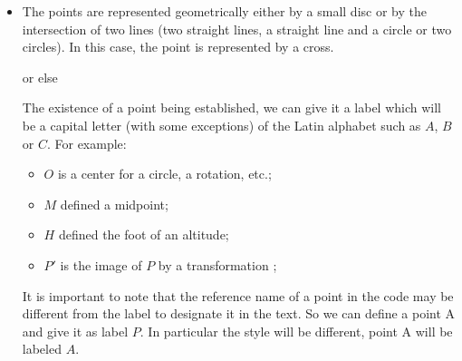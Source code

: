 \begin{itemize}
\item The points are represented geometrically either by a small disc or by the intersection of two lines (two straight lines, a straight line and a circle or two circles). In this case, the point is represented by a cross. 

\begin{tkzexample}[latex=6cm, small]     
\end{tkzexample}

or else

\begin{tkzexample}[latex=6cm, small]     
    \end{tkzexample}  

The existence of a point being established, we can give it a label which will be a capital letter (with some exceptions) of the Latin alphabet such as $A$, $B$ or $C$. For example:
\begin{itemize}
\item $O$ is a center for a circle, a rotation, etc.;
\item $M$ defined a midpoint;
\item $H$ defined the foot of an altitude;
\item $P'$ is the image of $P$ by a transformation ;
\end{itemize}

It is important to note that the reference name of a point in the code may be different from the label to designate it in the text. So we can define a point A and give it as label $P$. In particular the style will be different, point A will be labeled $A$. 

\begin{tkzexample}[latex=6cm, small]     
\end{tkzexample}


\end{itemize}
